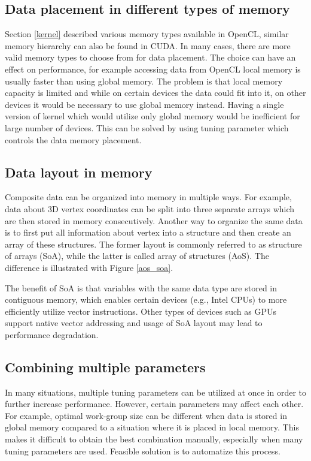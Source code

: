 \documentclass
[
    digital, %
    oneside, %
    table, %
    nolof, %
    nolot, %
    nocover %
]{fithesis3}
\begin{document}
\subsection{Data placement in different types of memory}
Section \ref{kernel} described various memory types available in OpenCL, similar memory hierarchy can also be found in CUDA. In many cases, there are
more valid memory types to choose from for data placement. The choice can have an effect on performance, for example accessing data from OpenCL local
memory is usually faster than using global memory. The problem is that local memory capacity is limited and while on certain devices the data could
fit into it, on other devices it would be necessary to use global memory instead. Having a single version of kernel which would utilize only global
memory would be inefficient for large number of devices. This can be solved by using tuning parameter which controls the data memory placement.

\subsection{Data layout in memory}
Composite data can be organized into memory in multiple ways. For example, data about 3D vertex coordinates can be split into three separate arrays
which are then stored in memory consecutively. Another way to organize the same data is to first put all information about vertex into a structure and
then create an array of these structures. The former layout is commonly referred to as structure of arrays (SoA), while the latter is called array
of structures (AoS). The difference is illustrated with Figure \ref{aos_soa}.

The benefit of SoA is that variables with the same data type are stored in contiguous memory, which enables certain devices (e.g., Intel CPUs) to more
efficiently utilize vector instructions. Other types of devices such as GPUs support native vector addressing and usage of SoA layout may lead to
performance degradation.

\subsection{Combining multiple parameters}
In many situations, multiple tuning parameters can be utilized at once in order to further increase performance. However, certain parameters may affect
each other. For example, optimal work-group size can be different when data is stored in global memory compared to a situation where it is placed in
local memory. This makes it difficult to obtain the best combination manually, especially when many tuning parameters are used. Feasible solution is to
automatize this process.
\end{document}
